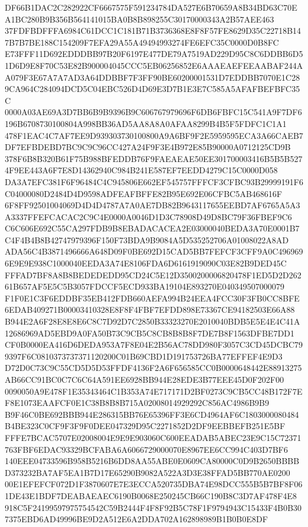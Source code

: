 \documentclass[UTF8,fontset=fandol,zihao=-4,a4paper]{ctexart}
\begin{document}
{{DF66B1DAC2C282922CF6667575F591234784DA527E6B70659A8B34BD63C70EA1BC280B9B356B564141015BA0B8B898255C30170000343A2B57AEE463
37FDFBDFFFA6984C61DCC1C181B71B3736368E8F8F57FE8629D35C22718B147B7B7BE188C154209F7EFA29A55A49494993274FE6EFC35C0000D0B8FC
E73FFF11D692EDDDBB97B20F6197E477DE79A7519AD229D95C8C6DDBB6D51D6D9E8F70C53E82B900004045CCC5EB06256852E6AAAEAEFEEAABAF244A
A079F3E67A7A7AD3A64DDBBF7F3FF90BE60200001531D7EDDBB7070E1C289CA964C284094DCD5C04EBC526D4D69E3D7B1E3E7C585A5AFAFBEFBFC35C
0000A03AE69A3D7BB6B9B9396B9C606767979696F6DB6FBFC15C541A9F7DF6196B6708730100804A998BB36AD5AA8A8A0AFAA8299B4B5F5FDFC1C1A1
478F1EAC4C7AF7EE9D939303730100800A9A6BF9F2E5959595ECA3A66CAEB7DF7EFBDEBD7BC9C9C96CC427A24F9F3E4B972E85B90000A0712125CD9B
378F6B8B320B61F75B988BFEDDB76F9FAEAEAE50EE301700003416B5B5B5274F9EE443A6F7E8D14362940C984B241E587EF7EEDD4279C15C0000D058
DA3A7EFC381F6F96484C4C945806E662EF545757FFFCF3CFBC93B29999191F6C04000080D2484D4D9598ADFEAFBFFE82B95E692E06CFBC5AB468616F
6F8FF92501004069D4D4D4787A7A0AE7DB82B9643117655EEBD7AF6765A5A3A3337FFEFCACAC2C9C4E0000A0046D1D3C78908D49D8BC79F36FBEF9C6
C6C606E692C55CA297FDB9B8EBADACACEA2E03000040BEDA3A70E0001B7C4F4B4B8B42747979396F150F73BDA9B9084A5D535252706A01008022A8AD
ADA56C4B3871496666A648D09F0BE692D15CAD5BB7FEFCF3CFF9A0C4969696E9E9E938C1000040EEDA3A74E8106FDA6D6161919090C03E82B9DED45C
FFFAD7BF8A8B8BEDEDEDD95CD24C5E12D3500200006820478F1ED5D2D26261B657AF5E5C5B3057FDCCF5ECD933BA19104E893270E040349507000079
F1F0E1C3F6EDDBF35EB412FDB660AEFA994B24EEA4FCC30F3FB0CC8BFE6EDAB409271B00003410328E8F8F4FBF7EFDD898E73367CE94182503E66A88
B944E2A6F28E8E8E6C8C7D92D7C2850B33323270E2010040BDB5E5E4E4C41A12686969AD5EBD9A0FA50B73C9CB5C8CB8B8B8F7DE7B8F1563DFBE7DD1
CF0B0000EA416D6DEDA953A7F8E04E2B56AC78DD980F3057C3CD45DCBC799397F6C0810373737371120200C01B69CBD1D191753726BA77EFFEF4E9D3
D72D0C73C9C55CD5D5D53FFDF4136F2A6F656585CC0B0000648442E88913275AB66CC91BC0C7C6C64A591EE6928BB944E28EDE3B77EEE45D0F202F00
0090050A9E478F1E35343464C1B353A74E717171D2BF0273C9CB5CC48B172F7EF8E1073EAAFCF0E1C38B8B8B715A02008014929292C856AC4986B9B9
B9F46C0BE692BBB944E286315BB76E65396FF3E6CD4964AF6C1803000080484B4BE323C0CF9F3F9F0DEE047329D95C2271852D2DF9EEBBEFB251E5BF
FFFE7BCAC5707E02008004E9E9E903060C600EEADAB5ABEC23E9C15C72371763FBF6EDAC93329BCFABA6A6066729000070E8967EE6CC994C403D7BF6
140EEE04733596B958B5216B6DD8AA55ABE0E0609CA80000C0D9B2650BBBBD373232BA7AF5EA1B7D17E65290B9082A522A3D3E38FFAD5BB770AE0200
00E1EFEFCF072D1F3870607E7E3ECCA520735DBA74E98DCC555B5B7BF8F061DE43E1BDF7DEABAEAEC6190B0068E250245CB66C190B8C3D7AF478F4E8
918C5F24199597975754542C59B2444F4F8F92B5C78F1F9794943C15433F4B0B307375EBD6AD49996BE9D2A512E6A2DDA702A162898989B1B0B0E8DF
}}
\end{document}
